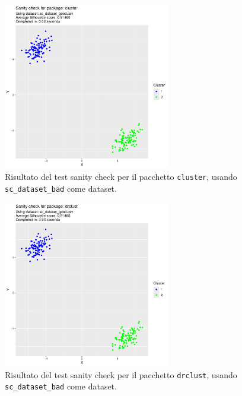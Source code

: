 \documentclass[a4paper, 12pt]{report}
\begin{document}
			\begin{figure}[H]
				\centering
				\includegraphics[width = 0.65\textwidth, page = 2]{results/results_CLUSTER.pdf}
				\caption{Risultato del test sanity check per il pacchetto \texttt{cluster}, usando \texttt{sc\_dataset\_bad} come dataset.}
				\label{fig:clusterbad}
			\end{figure}

			\begin{figure}[H]
				\centering
				\includegraphics[width = 0.65\textwidth, page = 2]{results/results_DRCLUST.pdf}
				\caption{Risultato del test sanity check per il pacchetto \texttt{drclust}, usando \texttt{sc\_dataset\_bad} come dataset.}
				\label{fig:drclustbad}
			\end{figure}
\end{document}
